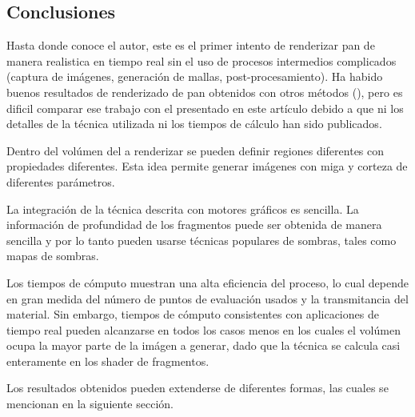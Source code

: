 \documentclass[oneside,a4paper,english,links]{amca}
\begin{document}
\subsection{Conclusiones}

Hasta donde conoce el autor, este es el primer intento de renderizar
pan de manera realistica en tiempo real sin el uso de procesos
intermedios complicados (captura de imágenes, generación de mallas,
post-procesamiento). Ha habido buenos resultados de renderizado de pan
obtenidos con otros métodos (\citep{Cho2007}), pero es dificil
comparar ese trabajo con el presentado en este artículo debido a que
ni los detalles de la técnica utilizada ni los tiempos de cálculo han
sido publicados.

Dentro del volúmen del a renderizar se pueden definir regiones
diferentes con propiedades diferentes. Esta idea permite generar
imágenes con miga y corteza de diferentes parámetros.

La integración de la técnica descrita con motores gráficos es
sencilla. La información de profundidad de los fragmentos puede ser
obtenida de manera sencilla y por lo tanto pueden usarse técnicas
populares de sombras, tales como mapas de sombras.

Los tiempos de cómputo muestran una alta eficiencia del proceso, lo
cual depende en gran medida del número de puntos de evaluación usados
y la transmitancia del material. Sin embargo, tiempos de cómputo
consistentes con aplicaciones de tiempo real pueden alcanzarse en
todos los casos menos en los cuales el volúmen ocupa la mayor parte de
la imágen a generar, dado que la técnica se calcula casi enteramente
en los shader de fragmentos. 

Los resultados obtenidos pueden extenderse de diferentes formas, las
cuales se mencionan en la siguiente sección.





\end{document}
